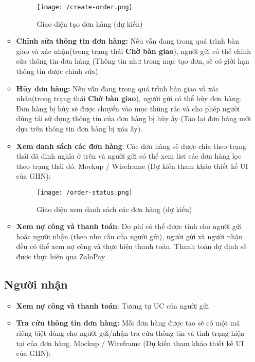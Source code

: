 \begin{itemize}
\begin{itemize}
		\begin{figure}[!ht]
			\texttt{[image: /create-order.png]}
			\centering
			\linebreak
			\caption{Giao diện tạo đơn hàng (dự kiến)}
		\end{figure}
		
		\item \textbf{Chỉnh sửa thông tin đơn hàng:} Nếu vẫn đang trong quá trình bàn giao và xác nhận(trong trạng thái \textbf{Chờ bàn giao}), người gửi có thể chỉnh sửa thông tin đơn hàng (Thông tin như trong mục tạo đơn, sẽ có giới hạn thông tin được chỉnh sửa).
		
		\item \textbf{Hủy đơn hàng:} Nếu vẫn đang trong quá trình bàn giao và xác nhận(trong trạng thái \textbf{Chờ bàn giao}), người gửi có thể hủy đơn hàng. Đơn hàng bị hủy sẽ được chuyển vào mục thùng rác và cho phép người dùng tái sử dụng thông tin của đơn hàng bị hủy ấy (Tạo lại đơn hàng mới dựa trên thông tin đơn hàng bị xóa ấy).
		
		\item \textbf{Xem danh sách các đơn hàng}: Các đơn hàng sẽ được chia theo trạng thái đã định nghĩa ở trên và người gửi có thể xem list các đơn hàng lọc theo trạng thái đó. Mockup / Wireframe (Dự kiến tham khảo thiết kế UI của GHN):
		
		\begin{figure}[!ht]
			\texttt{[image: /order-status.png]}
			\centering
			\linebreak
			\caption{Giao diện xem danh sách các đơn hàng (dự kiến)}
		\end{figure}
		
		\item \textbf{Xem nợ công và thanh toán}: Do phí có thể được tính cho người gửi hoặc người nhận (theo nhu cầu của người gửi), người gửi và người nhận đều có thể xem nợ công và thực hiện thanh toán. Thanh toán dự định sẽ được thực hiện qua ZaloPay
	\end{itemize}
	
	\subsection{Người nhận}
	\begin{itemize}
		\item \textbf{Xem nợ công và thanh toán}: Tương tự UC của người gửi
		
		\item \textbf{Tra cứu thông tin đơn hàng:} Mỗi đơn hàng được tạo sẽ có một mã riêng biệt dùng cho người gửi/nhận tra cứu thông tin và tình trạng hiện tại của đơn hàng. Mockup / Wireframe (Dự kiến tham khảo thiết kế UI của GHN): 
		

\end{itemize}
\end{itemize}
